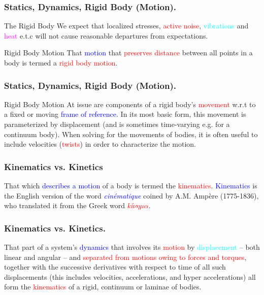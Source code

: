 \begin{frame}
	\frametitle{Statics, Dynamics, Rigid Body (Motion).}
	\begin{block}{The Rigid Body}
		We expect that \textcolor{light-blue}{localized stresses}, \textcolor{red}{active noise},  \textcolor{cyan}{vibrations} and \textcolor{magenta}{heat} e.t.c will not cause \textcolor{light-red}{reasonable departures} from expectations.
	\end{block}
	\begin{block}{Rigid Body Motion}
		That \textcolor{blue}{motion} that \textcolor{red}{preserves distance} between all points in a body is termed a \textcolor{red}{rigid body motion}.
	\end{block}
\end{frame}

\begin{frame}
	\frametitle{Statics, Dynamics, Rigid Body (Motion).}
	\begin{block}{Rigid Body Motion}
		At issue are components of a rigid body's \textcolor{red}{movement} w.r.t to a fixed or moving \textcolor{blue}{frame of reference}. In its most basic form, this movement is parameterized by displacement (and is sometimes time-varying e.g. for a continuum body). When solving for the movements of bodies, it is often useful to include velocities (\textcolor{red}{twists}) in order to characterize the motion.
	\end{block}
\end{frame}


\begin{frame}
	\frametitle{Kinematics vs. Kinetics}
	\begin{definition}[Kinematics.]
		That which \textcolor{blue}{describes a motion} of a body is termed the \textcolor{red}{kinematics}. \textcolor{blue}{{Kinematics}} is the English version of the word  \textcolor{blue}{\textit{cin{\'e}matique}} coined by A.M. Amp{\`e}re (1775-1836), who translated it from the Greek word \textcolor{red}{\textit{k{\'i}$\nu \eta \mu \alpha$}}.
	\end{definition}
\end{frame}

\begin{frame}
	\frametitle{Kinematics vs. Kinetics.}
	\begin{definition}
		That part of a system's \textcolor{blue}{dynamics} that involves its \textcolor{red}{motion} by \textcolor{cyan}{displacement} -- both linear and angular -- and \textcolor{red}{separated from motions owing to forces and  torques}, together with the successive derivatives with respect to time of all such displacements (this includes velocities, accelerations, and hyper accelerations) all form the \textcolor{red}{kinematics} of a \textcolor{light-blue}{{rigid}}, \textcolor{light-blue}{{continuum}} or \textcolor{light-blue}{{laminae}} of bodies.
	\end{definition}
\end{frame}


